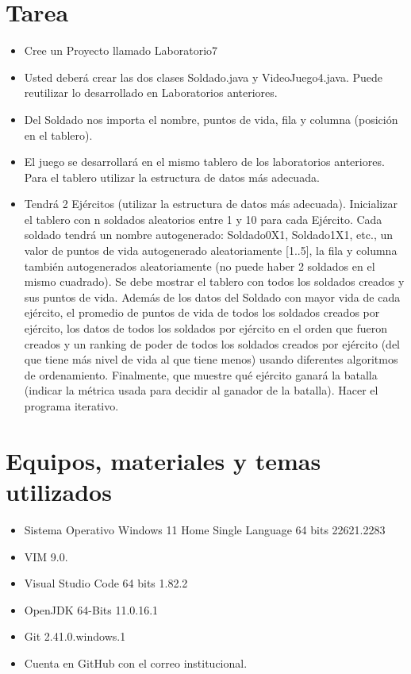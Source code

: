 \documentclass{article}
\begin{document}
	\section{Tarea}
	\begin{itemize}
		\subsection{Videojuego}
			\item Cree un Proyecto llamado Laboratorio7
			\item Usted deberá crear las dos clases Soldado.java y VideoJuego4.java. Puede reutilizar lo
desarrollado en Laboratorios anteriores.
			\item Del Soldado nos importa el nombre, puntos de vida, fila y columna (posición en el tablero).
			\item El juego se desarrollará en el mismo tablero de los laboratorios anteriores. Para el tablero
utilizar la estructura de datos más adecuada.
			\item Tendrá 2 Ejércitos (utilizar la estructura de datos más adecuada). Inicializar el tablero con n
soldados aleatorios entre 1 y 10 para cada Ejército. Cada soldado tendrá un nombre
autogenerado: Soldado0X1, Soldado1X1, etc., un valor de puntos de vida autogenerado
aleatoriamente [1..5], la fila y columna también autogenerados aleatoriamente (no puede
haber 2 soldados en el mismo cuadrado). Se debe mostrar el tablero con todos los soldados
creados y sus puntos de vida. Además de los datos del Soldado con mayor vida de cada ejército, el
promedio de puntos de vida de todos los soldados creados por ejército, los datos de todos los
soldados por ejército en el orden que fueron creados y un ranking de poder de todos los
soldados creados por ejército (del que tiene más nivel de vida al que tiene menos) usando diferentes algoritmos de ordenamiento. Finalmente, que muestre qué ejército ganará la
batalla (indicar la métrica usada para decidir al ganador de la batalla). Hacer el programa
iterativo.
	\end{itemize}
		
	\section{Equipos, materiales y temas utilizados}
	\begin{itemize}
		\item Sistema Operativo Windows 11 Home Single Language 64 bits 22621.2283
		\item VIM 9.0.
		\item Visual Studio Code 64 bits 1.82.2
		\item OpenJDK 64-Bits 11.0.16.1
		\item Git 2.41.0.windows.1
		\item Cuenta en GitHub con el correo institucional. 
	\end{itemize}
	
\end{document}
